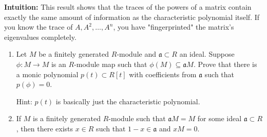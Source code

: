 \begin{solution}
\textbf{Intuition:}
This result shows that the traces of the powers of a matrix contain exactly the same amount of information as the characteristic polynomial itself. If you know the trace of $A, A^2, \dots, A^n$, you have "fingerprinted" the matrix's eigenvalues completely.
\end{solution}

\begin{exercise}
\label{algebra:2020:2}
\begin{enumerate}
\item Let $M$ be a finitely generated $R$-module and $\mathfrak{a} \subset R$ an ideal. Suppose $\phi: M \to M$ is an $R$-module map such that $\phi(M) \subseteq \mathfrak{a}M$. Prove that there is a monic polynomial $p(t) \subset R[t]$ with coefficients from $\mathfrak{a}$ such that $p(\phi) = 0$.

Hint: $p(t)$ is basically just the characteristic polynomial.

\item If $M$ is a finitely generated $R$-module such that $\mathfrak{a}M = M$ for some ideal $\mathfrak{a} \subset R$, then there exists $x \in R$ such that $1 - x \in \mathfrak{a}$ and $xM = 0$.
\end{enumerate}
\end{exercise}

